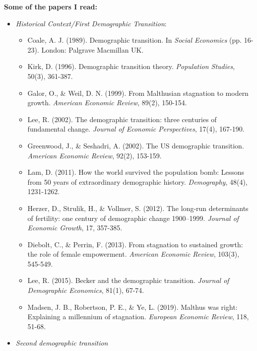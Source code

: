 \documentclass{article}
\begin{document}
\textbf{Some of the papers I read:}
\begin{itemize}
\item \textit{Historical Context/First Demographic Transition}:
\begin{itemize}
\item Coale, A. J. (1989). Demographic transition. In \textit{Social Economics} (pp. 16-23). London: Palgrave Macmillan UK.
\item Kirk, D. (1996). Demographic transition theory. \textit{Population Studies}, 50(3), 361-387.
\item Galor, O., \& Weil, D. N. (1999). From Malthusian stagnation to modern growth. \textit{American Economic Review}, 89(2), 150-154.
\item Lee, R. (2002). The demographic transition: three centuries of fundamental change. \textit{Journal of Economic Perspectives}, 17(4), 167-190.
\item Greenwood, J., \& Seshadri, A. (2002). The US demographic transition. \textit{American Economic Review}, 92(2), 153-159.
\item Lam, D. (2011). How the world survived the population bomb: Lessons from 50 years of extraordinary demographic history. \textit{Demography}, 48(4), 1231-1262.
\item Herzer, D., Strulik, H., \& Vollmer, S. (2012). The long-run determinants of fertility: one century of demographic change 1900–1999. \textit{Journal of Economic Growth}, 17, 357-385.
\item Diebolt, C., \& Perrin, F. (2013). From stagnation to sustained growth: the role of female empowerment. \textit{American Economic Review}, 103(3), 545-549.
\item Lee, R. (2015). Becker and the demographic transition. \textit{Journal of Demographic Economics}, 81(1), 67-74.
\item Madsen, J. B., Robertson, P. E., \& Ye, L. (2019). Malthus was right: Explaining a millennium of stagnation. \textit{European Economic Review}, 118, 51-68.
\end{itemize}

\item \textit{Second demographic transition}


\end{itemize}
\end{document}
